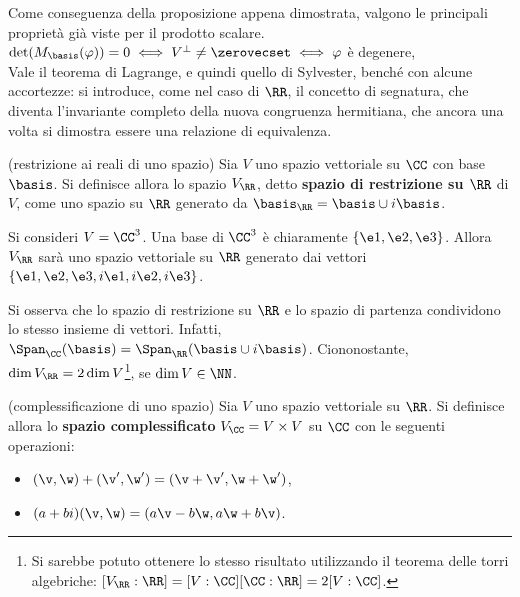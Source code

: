 \documentclass[11pt]{article}
\begin{document}
	\begin{remark}
		Come conseguenza della proposizione appena dimostrata, valgono
		le principali proprietà già viste per il prodotto scalare. \\
		
		\li $\det(M_\basis(\varphi)) = 0 \iff V^\perp \neq \zerovecset \iff \varphi$ è degenere, \\
		\li Vale il teorema di Lagrange, e quindi quello di Sylvester, benché con alcune accortezze: si
		introduce, come nel caso di $\RR$, il concetto di segnatura, che diventa l'invariante completo
		della nuova congruenza hermitiana, che ancora una volta si dimostra essere una relazione
		di equivalenza.
	\end{remark}

	\hr

	\begin{definition} (restrizione ai reali di uno spazio) Sia $V$
		uno spazio vettoriale su $\CC$ con base $\basis$. Si definisce allora lo spazio $V_\RR$, detto
		\textbf{spazio di restrizione su $\RR$} di $V$, come uno spazio su $\RR$ generato da
		$\basis_\RR = \basis \cup i \basis$. 
	\end{definition}

	\begin{example}
		Si consideri $V = \CC^3$. Una base di $\CC^3$ è chiaramente $\{ \e1, \e2, \e3 \}$. Allora
		$V_\RR$ sarà uno spazio vettoriale su $\RR$ generato dai vettori $\{ \e1, \e2, \e3, i\e1, i\e2, i\e3 \}$.
	\end{example}

	\begin{remark}
		Si osserva che lo spazio di restrizione su $\RR$ e lo spazio di partenza condividono lo stesso insieme
		di vettori. Infatti, $\Span_\CC(\basis) = \Span_\RR(\basis \cup i\basis)$. Ciononostante, $\dim V_\RR = 2 \dim V$\footnote{Si sarebbe potuto ottenere lo stesso risultato utilizzando il teorema delle torri algebriche: $[V_\RR : \RR] = [V: \CC] [\CC: \RR] = 2 [V : \CC]$.}, se $\dim V \in \NN$.
	\end{remark}

	\begin{definition} (complessificazione di uno spazio) Sia $V$ uno spazio vettoriale su $\RR$.
		Si definisce allora lo \textbf{spazio complessificato} $V_\CC = V \times V$ su $\CC$ con le seguenti operazioni:
		
		\begin{itemize}
			\item $(\v, \w) + (\v', \w') = (\v + \v', \w + \w')$,
			\item $(a+bi)(\v, \w) = (a\v - b\w, a\w + b\v)$.
		\end{itemize}
	\end{definition}
\end{document}
